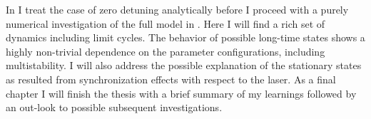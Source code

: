 In  I treat the case of zero detuning analytically before I proceed with a purely numerical investigation of the full model in . Here I will find a rich set of dynamics including limit cycles. The behavior of possible long-time states shows a highly non-trivial dependence on the parameter configurations, including multistability. I will also address the possible explanation of the stationary states as resulted from synchronization effects with respect to the laser. As a final chapter I will finish the thesis with a brief summary of my learnings followed by an out-look to possible subsequent investigations.\newpage
\printbibliography